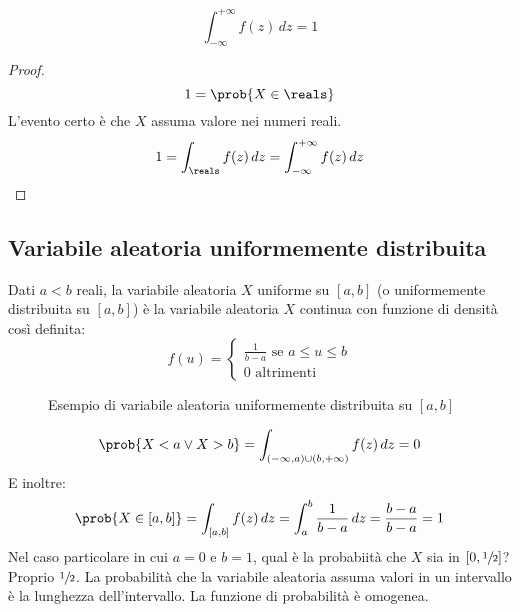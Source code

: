 \begin{oss}
\[
\int_{-\infty}^{+\infty} f(z) \, dz = 1
\]
\end{oss}

\begin{proof}
\[
1 = \prob{X \in \reals}
\]
L'evento certo \`e che $X$ assuma valore nei numeri reali.
\[
1 = \int_{\reals} f(z) \, dz = \int_{-\infty}^{+\infty} f(z) \, dz
\]
\end{proof}

\subsection{Variabile aleatoria uniformemente distribuita}

\begin{defn}
Dati $a < b$ reali, la variabile aleatoria $X$ uniforme su $[a,b]$ (o uniformemente distribuita su $[a,b]$) \`e la variabile aleatoria $X$ continua con funzione di densit\`a cos\`i definita:
\[
f(u) =
\begin{cases}
\frac{1}{b - a} \text{ se } a \le u \le b \\
0 \text{ altrimenti}
\end{cases}
\]
\end{defn}

\begin{figure}[ht]
\centering
{}
\caption{\label{fig:distribuzione}Esempio di variabile aleatoria uniformemente distribuita su $[a,b]$}
\end{figure}
\[
\prob{X < a \lor X > b} =
\int_{(-\infty,a) \cup (b,+\infty)} f(z) \, dz = 0
\]
E inoltre:
\[
\prob{X \in [a,b]} =
\int_{[a,b]} f(z) \, dz = \int_{a}^{b} \frac{1}{b - a} \, dz = 
\frac{b - a}{b - a} = 1
\]
Nel caso particolare in cui $a = 0$ e $b = 1$, qual \`e la probabiit\`a che $X$ sia in $[0, \sfrac{1}{2}]$? Proprio $\sfrac{1}{2}$. La probabilit\`a che la variabile aleatoria assuma valori in un intervallo \`e la lunghezza dell'intervallo. La funzione di probabilit\`a \`e omogenea.

